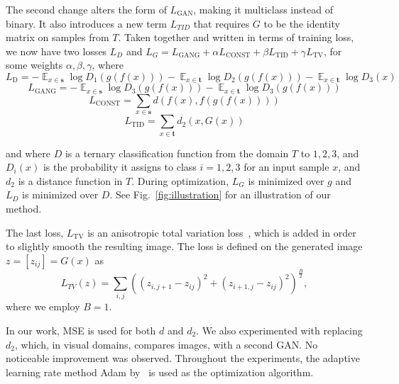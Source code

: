 \documentclass{article} %
\DeclareMathOperator{\E}{\mathbb{E}}
\begin{document}
The second change alters the form of $L_\text{GAN}$, making it multiclass instead of binary. It also introduces a new term $L_{TID}$ that requires $G$ to be the identity matrix on samples from $T$. Taken together and written in terms of training loss, we now have two losses $L_D$ and $L_G = L_\text{GANG} + \alpha L_{\text{CONST}} + \beta L_{\text{TID}} + \gamma L_{\text{TV}}$, for some weights $\alpha,\beta,\gamma$, where
\begin{equation}
L_{\text{D}} = -\E_{x \in \mathbf s} \log D_1(g(f(x))) - \E_{x \in \mathbf t} \log D_2(g(f(x))) - \E_{x \in \mathbf t} \log D_3(x) 
\end{equation}
\begin{equation}
L_{\text{GANG}} = -\E_{x \in \mathbf s} \log D_3(g(f(x))) - \E_{x \in \mathbf t} \log D_3(g(f(x)))  
\end{equation}
\begin{equation}
L_{\text{CONST}} = \sum_{x \in \mathbf s} d(f(x),f(g(f(x))))
\end{equation}
\begin{equation}
L_{\text{TID}} = \sum_{x \in \mathbf t} d_2(x,G(x))
\end{equation}

and where $D$ is a ternary classification function from the domain $T$ to ${1,2,3}$, and $D_i(x)$ is the probability it assigns to class $i=1,2,3$ for an input sample $x$, and $d_2$ is a distance function in $T$. During optimization, $L_G$ is minimized over $g$ and $L_D$ is minimized over $D$. See Fig.~\ref{fig:illustration} for an illustration of our method.

The last loss, $L_{\text{TV}}$ is an anisotropic total variation loss~\citep{TV,Mahendran15}, which is added in order to slightly smooth the resulting image. The loss is defined on the generated image $z=[z_{ij}]=G(x)$ as 
\begin{equation} 
L_{TV}(z) =
 \sum_{i,j}
 \left(
 \left(z_{i,j+1} - z_{ij}\right)^2 +
 \left(z_{i+1,j} - z_{ij}\right)^2
 \right)^\frac{B}{2}, 
\end{equation}
where we employ $B = 1$.

In our work, MSE is used for both $d$ and $d_2$. We also experimented with replacing $d_2$, which, in visual domains, compares images, with a second GAN. No noticeable improvement was observed. Throughout the experiments, the adaptive learning rate method Adam by~\citet{adam} is used as the optimization algorithm. 
\end{document}
